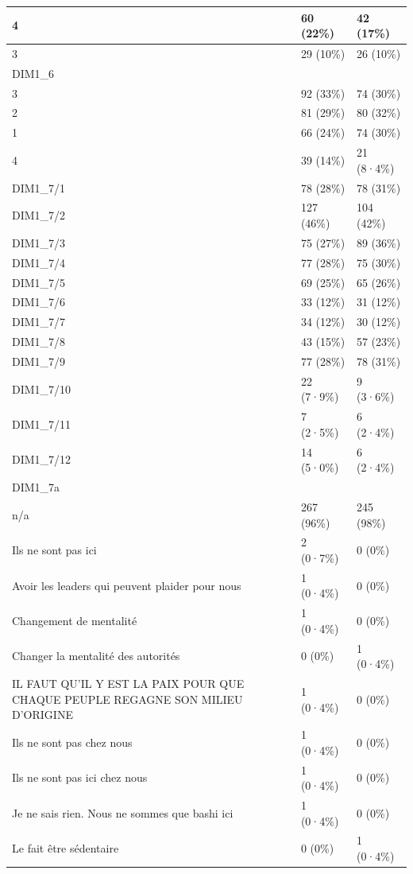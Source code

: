 \documentclass[
]{book}
\begin{document}
\begin{tabular}{l|l|l}
\hline
4 & 60 (22\%) & 42 (17\%)\\
\hline
3 & 29 (10\%) & 26 (10\%)\\
\hline
DIM1\_6 &  & \\
\hline
3 & 92 (33\%) & 74 (30\%)\\
\hline
2 & 81 (29\%) & 80 (32\%)\\
\hline
1 & 66 (24\%) & 74 (30\%)\\
\hline
4 & 39 (14\%) & 21 (8·4\%)\\
\hline
DIM1\_7/1 & 78 (28\%) & 78 (31\%)\\
\hline
DIM1\_7/2 & 127 (46\%) & 104 (42\%)\\
\hline
DIM1\_7/3 & 75 (27\%) & 89 (36\%)\\
\hline
DIM1\_7/4 & 77 (28\%) & 75 (30\%)\\
\hline
DIM1\_7/5 & 69 (25\%) & 65 (26\%)\\
\hline
DIM1\_7/6 & 33 (12\%) & 31 (12\%)\\
\hline
DIM1\_7/7 & 34 (12\%) & 30 (12\%)\\
\hline
DIM1\_7/8 & 43 (15\%) & 57 (23\%)\\
\hline
DIM1\_7/9 & 77 (28\%) & 78 (31\%)\\
\hline
DIM1\_7/10 & 22 (7·9\%) & 9 (3·6\%)\\
\hline
DIM1\_7/11 & 7 (2·5\%) & 6 (2·4\%)\\
\hline
DIM1\_7/12 & 14 (5·0\%) & 6 (2·4\%)\\
\hline
DIM1\_7a &  & \\
\hline
n/a & 267 (96\%) & 245 (98\%)\\
\hline
Ils ne sont pas ici & 2 (0·7\%) & 0 (0\%)\\
\hline
Avoir les leaders qui peuvent plaider pour nous & 1 (0·4\%) & 0 (0\%)\\
\hline
Changement de mentalité & 1 (0·4\%) & 0 (0\%)\\
\hline
Changer la mentalité des autorités & 0 (0\%) & 1 (0·4\%)\\
\hline
IL FAUT QU'IL Y EST LA PAIX POUR QUE CHAQUE PEUPLE REGAGNE SON MILIEU D'ORIGINE & 1 (0·4\%) & 0 (0\%)\\
\hline
Ils ne sont pas chez nous & 1 (0·4\%) & 0 (0\%)\\
\hline
Ils ne sont pas ici chez nous & 1 (0·4\%) & 0 (0\%)\\
\hline
Je ne sais rien. Nous ne sommes que bashi ici & 1 (0·4\%) & 0 (0\%)\\
\hline
Le fait être sédentaire & 0 (0\%) & 1 (0·4\%)\\

\end{tabular}
\end{document}
